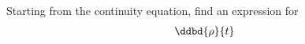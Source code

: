 
 Starting from the continuity equation, find an expression for 
\begin{align}
\ddbd{\rho}{t}
\end{align}
